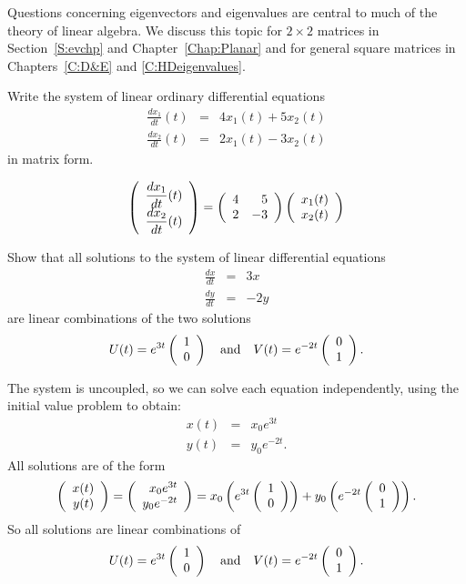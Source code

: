 \documentclass{ximera}
\begin{document}
Questions concerning eigenvectors and eigenvalues are central to
much of the theory of linear algebra.  We discuss this
topic for $2\times 2$ matrices in Section~\ref{S:evchp} and
Chapter~\ref{Chap:Planar} and for general square matrices in
Chapters~\ref{C:D&E} and \ref{C:HDeigenvalues}.

\EXER

\TEXER

\begin{exercise} \label{c4.1.5}
Write the system of linear ordinary differential equations
\begin{eqnarray*}
\frac{dx_1}{dt}(t) & = & 4x_1(t) + 5x_2(t) \\
\frac{dx_2}{dt}(t) & = & 2x_1(t) - 3x_2(t)
\end{eqnarray*}
in matrix form.

\begin{solution}

\arraystart
\[
\left(\begin{array}{r} \displaystyle\frac{dx_1}{dt}(t) \\ 
\displaystyle\frac{dx_2}{dt}(t)\end{array}\right) =
\left(\begin{array}{rr} 4 & 5 \\ 2 & -3\end{array}\right)
\left(\begin{array}{r} x_1(t) \\ x_2(t)\end{array}\right)
\]
\arrayfinish

\end{solution}
\end{exercise}

\begin{exercise} \label{c4.4.4}
Show that all solutions to the system of linear differential equations
\begin{eqnarray*}
\frac{dx}{dt} & = & 3x \\
\frac{dy}{dt} & = & -2y
\end{eqnarray*}
are linear combinations of the two solutions
\[
U(t) = e^{3t}\left(\begin{array}{r} 1 \\ 0\end{array}\right) \quad\mbox{and}\quad V(t) = e^{-2t}\left(\begin{array}{r} 0 \\ 1\end{array}\right).
\]

\begin{solution}

The system is uncoupled, so we can solve each equation
independently, using the initial value problem to obtain:
\[ \begin{array}{rcl}
x(t) & = & x_0e^{3t} \\
y(t) & = & y_0e^{-2t}. \end{array} \]
All solutions are of the form
\[ \left(\begin{array}{r} x(t) \\ y(t)\end{array}\right) = \left(\begin{array}{r} x_0e^{3t} \\ y_0e^{-2t}\end{array}\right)
= x_0\left(e^{3t}\left(\begin{array}{r} 1 \\ 0\end{array}\right)\right) +
y_0\left(e^{-2t}\left(\begin{array}{r} 0 \\ 1\end{array}\right)\right). \]
So all solutions are linear combinations of
\[ 
U(t) = e^{3t}\left(\begin{array}{r} 1 \\ 0\end{array}\right) \quad\mbox{and}\quad V(t) = e^{-2t}\left(\begin{array}{r} 0 \\ 1\end{array}\right). 
\]

\end{solution}
\end{exercise}
\end{document}
